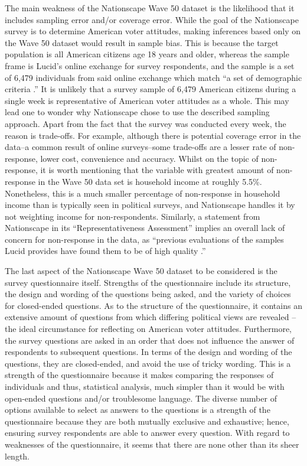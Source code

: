 \documentclass[
]{article}
\begin{document}
The main weakness of the Nationscape Wave 50 dataset is the likelihood that it includes sampling error and/or coverage error. While the goal of the Nationscape survey is to determine American voter attitudes, making inferences based only on the Wave 50 dataset would result in sample bias. This is because the target population is all American citizens age 18 years and older, whereas the sample frame is Lucid's online exchange for survey respondents, and the sample is a set of 6,479 individuals from said online exchange which match ``a set of demographic criteria \citep{tausanovitch_vavreck_reny_hayes_rudkin_2019}.'' It is unlikely that a survey sample of 6,479 American citizens during a single week is representative of American voter attitudes as a whole. This may lead one to wonder why Nationscape chose to use the described sampling approach. Apart from the fact that the survey was conducted every week, the reason is trade-offs. For example, although there is potential coverage error in the data--a common result of online surveys--some trade-offs are a lesser rate of non-response, lower cost, convenience and accuracy. Whilst on the topic of non-response, it is worth mentioning that the variable with greatest amount of non-response in the Wave 50 data set is household income at roughly 5.5\%. Nonetheless, this is a much smaller percentage of non-response in household income than is typically seen in political surveys, and Nationscape handles it by not weighting income for non-respondents. Similarly, a statement from Nationscape in its ``Representativeness Assessment'' implies an overall lack of concern for non-response in the data, as ``previous evaluations of the samples Lucid provides have found them to be of high quality \citep{tausanovitch_vavreck_reny_hayes_rudkin_2019}.''

The last aspect of the Nationscape Wave 50 dataset to be considered is the survey questionnaire itself. Strengths of the questionnaire include its structure, the design and wording of the questions being asked, and the variety of choices for closed-ended questions. As to the structure of the questionnaire, it contains an extensive amount of questions from which differing political views are revealed -- the ideal circumstance for reflecting on American voter attitudes. Furthermore, the survey questions are asked in an order that does not influence the answer of respondents to subsequent questions. In terms of the design and wording of the questions, they are closed-ended, and avoid the use of tricky wording. This is a strength of the questionnaire because it makes comparing the responses of individuals and thus, statistical analysis, much simpler than it would be with open-ended questions and/or troublesome language. The diverse number of options available to select as answers to the questions is a strength of the questionnaire because they are both mutually exclusive and exhaustive; hence, ensuring survey respondents are able to answer every question. With regard to weaknesses of the questionnaire, it seems that there are none other than its sheer length.
\end{document}
